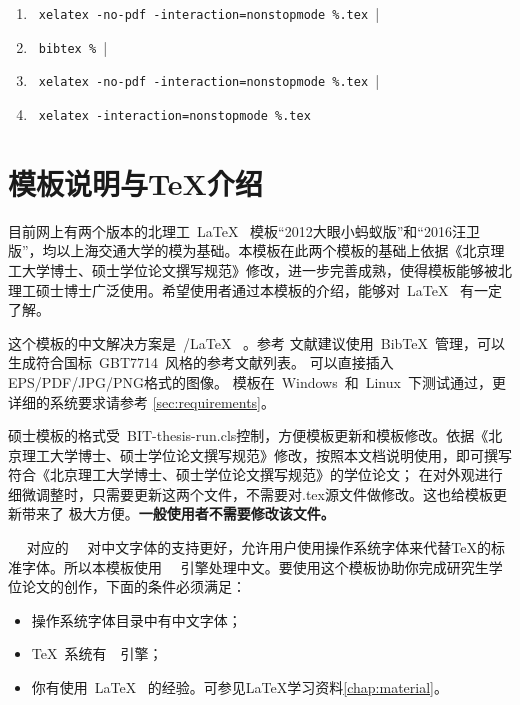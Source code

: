 {\color{blue}
\begin{enumerate}
\item[] ~\verb|xelatex -no-pdf -interaction=nonstopmode %.tex ||
\item[] ~\verb|bibtex % || 
\item[] ~\verb|xelatex -no-pdf -interaction=nonstopmode %.tex ||
\item[] ~\verb|xelatex -interaction=nonstopmode %.tex|
\end{enumerate}}


\section{模板说明与TeX介绍}
\label{sec:features}
 
目前网上有两个版本的北理工~\LaTeX~ 模板“2012大眼小蚂蚁版”和“2016汪卫版”，均以上海交通大学的模为基础。本模板在此两个模板的基础上依据《北京理工大学博士、硕士学位论文撰写规范》修改，进一步完善成熟，使得模板能够被北理工硕士博士广泛使用。希望使用者通过本模板的介绍，能够对~\LaTeX~ 有一定了解。

这个模板的中文解决方案是~\XeTeX/\LaTeX~ 。参考
文献建议使用~BibTeX~管理，可以生成符合国标~GBT7714~风格的参考文献列表。
可以直接插入EPS/PDF/JPG/PNG格式的图像。
模板在~Windows~和~Linux~下测试通过，更详细的系统要求请参考
\ref{sec:requirements}。

硕士模板的格式受~BIT-thesis-run.cls控制，方便模板更新和模板修改。依据《北京理工大学博士、硕士学位论文撰写规范》修改，按照本文档说明使用，即可撰写符合《北京理工大学博士、硕士学位论文撰写规范》的学位论文；
在对外观进行细微调整时，只需要更新这两个文件，不需要对.tex源文件做修改。这也给模板更新带来了
极大方便。\textbf{一般使用者不需要修改该文件。}
 
~\XeLaTeX~ 对应的~\XeTeX~ 对中文字体的支持更好，允许用户使用操作系统字体来代替TeX的标准字体。所以本模板使用~\XeLaTeX~ 引擎处理中文。要使用这个模板协助你完成研究生学位论文的创作，下面的条件必须满足：

\begin{itemize}
\item  操作系统字体目录中有中文字体；
\item  \TeX~系统有~\XeTeX~引擎；
\item  你有使用~\LaTeX~ 的经验。可参见LaTeX学习资料\ref{chap:material}。
\end{itemize}


